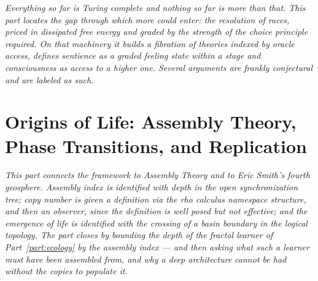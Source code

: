 \documentclass[12pt,openright,twoside]{book}
\theoremstyle{remark}
\theoremstyle{plain}
\theoremstyle{remark}
\theoremstyle{plain}
\theoremstyle{plain}
\begin{document}
\vspace{1em}
\begin{mdframed}[backgroundcolor=remarkgray, linecolor=gray!60,
                 linewidth=1pt, topline=false, rightline=false,
                 bottomline=false]
\small\itshape
Everything so far is Turing complete and nothing so far is more than
that.
This part locates the gap through which more could enter: the resolution
of races, priced in dissipated free energy and graded by the strength of
the choice principle required.
On that machinery it builds a fibration of theories indexed by oracle
access, defines sentience as a graded feeling state within a stage and
consciousness as access to a higher one.
Several arguments are frankly conjectural and are labeled as such.
\end{mdframed}

\bigskip


\part{Origins of Life: Assembly Theory, Phase Transitions, and Replication}
\label{part:origins}

\vspace{1em}
\begin{mdframed}[backgroundcolor=remarkgray, linecolor=gray!60,
                 linewidth=1pt, topline=false, rightline=false,
                 bottomline=false]
\small\itshape
This part connects the framework to Assembly Theory and to Eric Smith's
fourth geosphere.
Assembly index is identified with depth in the open synchronization tree;
copy number is given a definition via the rho calculus namespace
structure, and then an observer, since the definition is well posed but
not effective; and the emergence of life is identified with the crossing
of a basin boundary in the logical topology.
The part closes by bounding the depth of the fractal learner of
Part~\ref{part:ecology} by the assembly index --- and then asking what
such a learner must have been assembled from, and why a deep architecture
cannot be had without the copies to populate it.
\end{mdframed}
\end{document}

